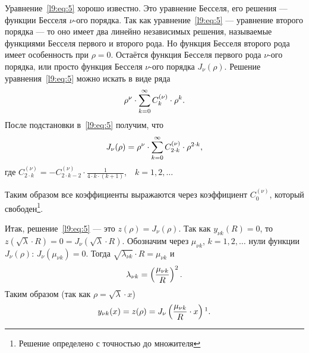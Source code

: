 Уравнение~\eqref{l9:eq:5} хорошо известно. Это уравнение Бесселя, его решения --- функции Бесселя $\nu$-ого порядка. Так как уравнение~\eqref{l9:eq:5} --- уравнение второго порядка --- то оно имеет два линейно независимых решения, называемые функциями Бесселя первого и второго рода. Но функция Бесселя второго рода имеет особенность при $\rho=0$. Остаётся функция Бесселя первого рода $\nu$-ого порядка, или просто функция Бесселя $\nu$-ого порядка $J_\nu(\rho)$. Решение уравнения~\eqref{l9:eq:5} можно искать в виде ряда
\begin{equation*}
	\hfill\rho^{\nu}\cdot\sum\limits_{k=0}^{\infty}C_k^{(\nu)}\cdot\rho^k.\hfill
\end{equation*}  
После подстановки в~\eqref{l9:eq:5} получим, что 
\begin{equation}\label{l9:eq:6}
	\hfill J_{\nu}(\rho)=\rho^{\nu}\cdot\sum\limits_{k=0}^{\infty}C_{2\cdot k}^{(\nu)}\cdot\rho^{2\cdot k},\hfill
\end{equation}
где $\displaystyle C_{2\cdot k}^{(\nu)}=-C_{2\cdot k-2}^{(\nu)}\cdot\frac{1}{4\cdot k\cdot(k+1)}$,$\quad k=1,2,\ldots$

\noindent Таким образом все коэффициенты выражаются через коэффициент $C_0^{(\nu)}$, который свободен\footnote{Решение определено с точностью до множителя}.

Итак, решение~\eqref{l9:eq:5} --- это $z(\rho)=J_{\nu}(\rho)$. Так как $y_{\nu k}(R)=0$, то $z(\sqrt{\lambda}\cdot R)=0=J_{\nu}\left(\sqrt{\lambda}\cdot R\right)$. Обозначим через $\mu_{\nu k}$, $k=1,2,\ldots$ нули функции $J_{\nu}(\rho):\,J_{\nu}\left(\mu_{\nu k}\right)=0$. Тогда $\sqrt{\lambda_{\nu k}}\cdot R=\mu_{\nu k}$ и 
\begin{equation}\label{l9:eq:7}
	\hfill\lambda_{\nu k}=\left(\frac{\mu_{\nu k}}{R}\right)^2.\hfill
\end{equation}
Таким образом (так как $\rho=\sqrt{\lambda}\cdot x$)
\begin{equation}\label{l9:eq:8}
	\hfill y_{\nu k}(x)=z(\rho)=J_{\nu}\left(\frac{\mu_{\nu k}}{R}\cdot x\right)\footnotemark{}.\hfill
\end{equation}

